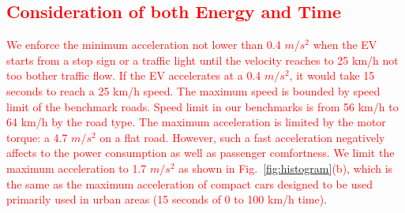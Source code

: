 \documentclass{IEEEtran}
\begin{document}
\textcolor{red}{\subsection{Consideration of both Energy and Time}} \label{subsec:energy_time}

\textcolor{red}{We enforce the minimum acceleration not lower than 0.4 $m/s^2$ when the EV starts from a stop sign or a traffic light until the velocity reaches to 25 km/h not too bother traffic flow. If the EV accelerates at a 0.4 $m/s^2$, it would take 15 seconds to reach a 25 km/h speed. The maximum speed is bounded by speed limit of the benchmark roads. Speed limit in our benchmarks is from 56 km/h to 64 km/h by the road type.
%
The maximum acceleration is limited by the motor torque: a 4.7 $m/s^2$ on a flat road.  However, such a fast acceleration negatively affects to the  power consumption as well as passenger comfortness. We limit the maximum acceleration to 1.7 $m/s^2$ as shown in Fig.~\ref{fig:histogram}(b), which is the same as the maximum acceleration of compact cars designed to be used primarily used in urban areas (15 seconds of 0 to 100 km/h time).}
\end{document}
